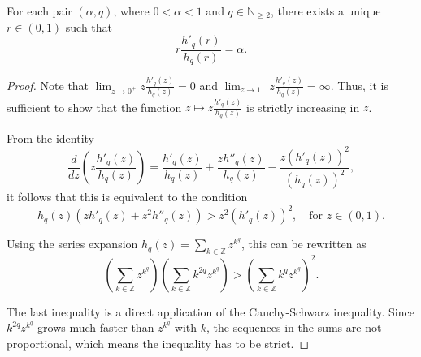 \documentclass[10pt,a4paper]{amsart}
\newcommand{\N}{\mathbb{N}}
\newcommand{\Z}{\mathbb{Z}}
\begin{document}
\begin{Lem}
\label{lem:3.5}
For each pair $(\alpha, q)$, where $0<\alpha<1$ and $q\in\N_{\geq 2}$, there exists a unique $r \in (0,1)$ such that 
\[
r \frac{h'_q(r)}{h_q(r)}=\alpha.
\]
\end{Lem}

\begin{proof}
Note that $\lim_{z \to 0^+} z \frac{h'_q(z)}{h_q(z)} = 0$ and $\lim_{z \to 1^-} z \frac{h'_q(z)}{h_q(z)} = \infty$. Thus, it is sufficient to show that the function $z \mapsto z\frac{h'_q(z)}{h_q(z)}$ is strictly increasing in $z$.

From the identity
\[
\frac{d}{dz}\left(z\frac{h'_q(z)}{h_q(z)}\right) = \frac{h'_q(z)}{h_q(z)} + \frac{z h''_q(z)}{h_q(z)} - \frac{z (h'_q(z))^2}{(h_q(z))^2},
\]
it follows that this is equivalent to the condition
\[
h_q(z)\left(z h'_q(z) + z^2 h''_q(z)\right) > z^2 (h'_q(z))^2, \quad \text{for } z\in (0,1).
\]

Using the series expansion $h_q(z) = \sum_{k\in\Z} z^{k^q}$, this can be rewritten as
\[
\left( \sum_{k\in\Z} z^{k^q} \right) \left( \sum_{k\in\Z} k^{2q}z^{k^q} \right) > \left( \sum_{k\in\Z} k^q z^{k^q}\right)^2.
\]

The last inequality is a direct application of the Cauchy-Schwarz inequality. Since $k^{2q}z^{k^q}$ grows much faster than $z^{k^q}$ with $k$, the sequences in the sums are not proportional, which means the inequality has to be strict.
\end{proof}
\end{document}
